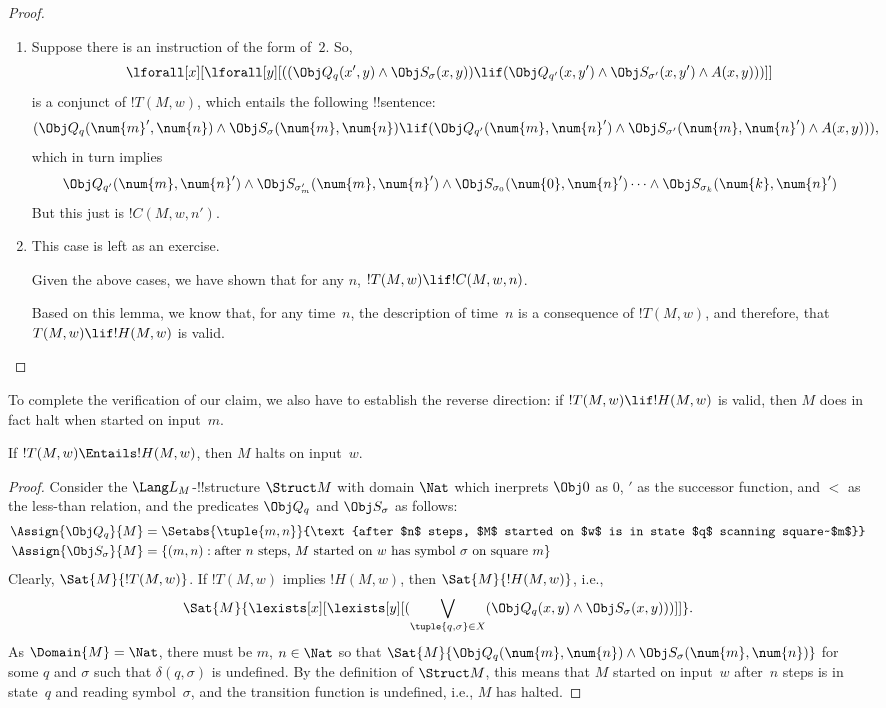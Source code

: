 \documentclass[../../../include/open-logic-section]{subfiles}
\begin{document}
\begin{proof}
\begin{enumerate}
\item Suppose there is an instruction of the form of~$2$. So, 
\[
\lforall[x][\lforall[y][((\Obj Q_{q}(x', y) \land \Obj
S_{\sigma}(x, y)) \lif (\Obj Q_{q'}(x, y') \land \Obj
S_{\sigma'}(x, y') \land A(x, y)))]] 
\] 
is a conjunct of $!T(M,w)$, which entails the following !!{sentence}: 
\[ 
(\Obj Q_{q}(\num{m}', \num{n}) \land \Obj S_{\sigma}(\num{m}, \num{n}) \lif
(\Obj Q_{q'}(\num{m}, \num{n}') \land \Obj S_{\sigma'}(\num{m}, \num{n}') \land A(x, y))),
\]
which in turn implies \[ \Obj
Q_{q'}(\num{m}, \num{n}')\land \Obj S_{\sigma'_m}(\num{m},
\num{n}') \land \Obj S_{\sigma_0}(\num{0}, \num{n}')\dots \land
\Obj S_{\sigma_k}(\num{k}, \num{n}') 
\] 
But this just is $!C(M, w, n')$.

\item This case is left as an exercise.

Given the above cases, we have shown that for any $n$, $!T(M, w) \lif !C(M,
w, n)$.

Based on this lemma, we know that, for any time~$n$, the description of
time~$n$ is a consequence of $!T(M, w)$, and therefore, that $T(M, w) \lif
!H(M, w)$ is valid.
\end{enumerate} 
\end{proof}

\begin{explain} 
To complete the verification of our claim, we also have to
establish the reverse direction: if $!T(M, w) \lif !H(M, w)$ is valid, then
$M$ does in fact halt when started on input~$m$. 
\end{explain}

\begin{lem}
If $!T(M, w) \Entails !H(M, w)$, then $M$ halts on input~$w$.
\end{lem}

\begin{proof} 
Consider the $\Lang L_M$-!!{structure} $\Struct M$ with
domain $\Nat$ which inerprets $\Obj 0$ as $0$, $'$ as the successor
function, and $<$ as the less-than relation, and the predicates $\Obj Q_q$
and $\Obj S_\sigma$ as follows:
\begin{align*}
  \Assign{\Obj Q_q}{M} & =
\Setabs{\tuple{m, n}}{\text{after $n$ steps, $M$ started on $w$ is in state $q$
  scanning square~$m$}} \\
\Assign{\Obj S_\sigma}{M} & = \{(m, n) :
\text{after $n$ steps, $M$ started on $w$ has symbol~$\sigma$ on
  square~$m$}\}
\end{align*}
Clearly, $\Sat{M}{!T(M, w)}$. If $!T(M, w)$
implies $!H(M, w)$, then $\Sat{M}{!H(M, w)}$, i.e.,
\[
\Sat{M}{\lexists[x][\lexists[y][(\bigvee_{\tuple{q, \sigma} \in
      X}(\Obj Q_q(x, y) \land \Obj S_\sigma(x, y)))]]}.
\]
As $\Domain{M} = \Nat$, there must be $m$, $n \in \Nat$ so that
$\Sat{M}{\Obj Q_q(\num{m}, \num{n}) \land \Obj S_\sigma(\num{m},
  \num{n})}$ for some $q$ and $\sigma$ such that $\delta(q, \sigma)$
is undefined. By the definition of $\Struct M$, this means that $M$
started on input~$w$ after~$n$ steps is in state~$q$ and reading
symbol~$\sigma$, and the transition function is undefined, i.e., $M$
has halted.
\end{proof}
\end{document}
